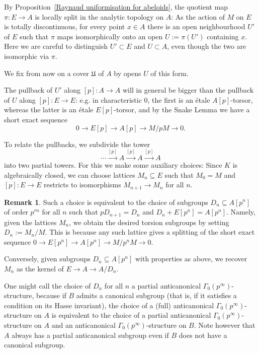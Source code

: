 \documentclass[10pt,oneside]{amsart}
\theoremstyle{definition}
\newtheorem{remark}[theorem]{Remark}
\begin{document}
By Proposition~\ref{Raynaud uniformisation for abeloids}, the quotient map $\pi\colon E\to A$ is locally split in the analytic topology on $A$: As the action of $M$ on $E$ is totally discontinuous, for every point  $x\in A$ there is an open neighbourhood $U'$ of $E$ such that $\pi$ maps isomorphically onto an open $U:=\pi(U')$ containing $x$. Here we are careful to distinguish $U'\subset E$ and $U\subset A$, even though the two are isomorphic via $\pi$.

We fix from now on a cover $\mathfrak U$ of $A$ by opens $U$ of this form.

The pullback of $U'$ along $[p]\colon A\to A$ will in general be bigger than the pullback of $U$ along $[p]:E\to E$: e.g. in characteristic 0, the first is an \'etale $A[p]$-torsor, whereas  the latter is an \'etale $E[p]$-torsor, and by the Snake Lemma we have a short exact sequence
\[0\to E[p]\to A[p]\to M/pM\to 0.\]

To relate the pullbacks, we subdivide the tower 
\[
\cdots\xrightarrow{[p]}A \xrightarrow{[p]}A\xrightarrow{[p]}A
\]
into two partial towers. For this we make some auxiliary choices: Since $K$ is algebraically closed, we can choose lattices $M_n\subseteq E$ such that $M_0=M$ and $[p]\colon E\rightarrow E$ restricts to isomorphisms $M_{n+1}\rightarrow M_n$ for all $n$.
	
	\begin{remark}\label{remark: Definition of the D_n}
		Such a choice is equivalent to the choice of subgroups $D_n\subseteq A[p^n]$ of order $p^{rn}$ for all $n$ such that $pD_{n+1}=D_n$ and $D_n+E[p^n]=A[p^n]$. Namely,
		given the lattices $M_{n}$, we obtain the desired torsion subgroups by setting $D_n:=M_{n}/M$. This is because any such lattice gives a splitting of the short exact sequence $0\rightarrow E[p^n]\rightarrow A[p^n]\rightarrow M/p^nM \rightarrow 0$.
		
		Conversely, given subgroups $D_n\subseteq A[p^n]$ with properties as above, we recover $M_n$ as the kernel of $E\rightarrow A\rightarrow A/D_n$.
		
		One might call the choice of $D_n$ for all $n$ a partial anticanonical $\Gamma_0(p^\infty)$-structure, because if $B$ admits a canonical subgroup (that is, if it satisfies a condition on its Hasse invariant), the choice of a (full) anticanonical $\Gamma_0(p^\infty)$-structure on $A$ is equivalent to the choice of a partial anticanonical $\Gamma_0(p^\infty)$-structure on $A$ and an anticanonical $\Gamma_0(p^\infty)$-structure on $B$. Note however that $A$ always has a partial anticanonical subgroup even if $B$ does not have a canonical subgroup.
	\end{remark}
	
\end{document}
